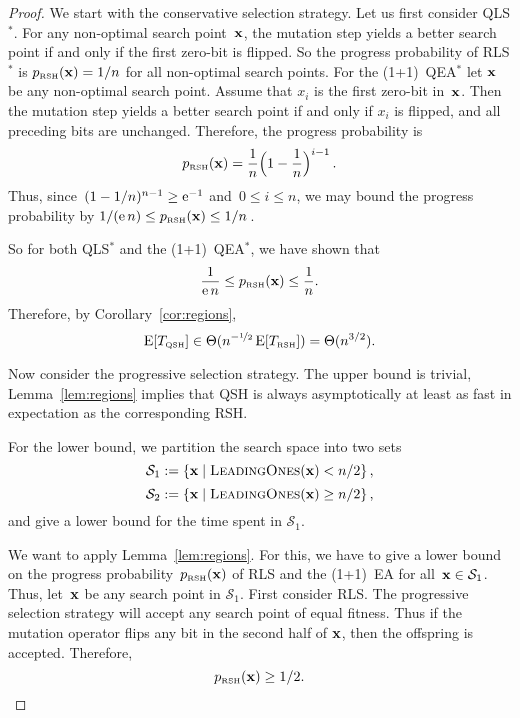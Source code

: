 \documentclass[a4paper,11pt]{article}
\begin{document}
\begin{proof}
 We start with the conservative selection strategy. Let us first consider QLS$^*$. For any non-optimal search point~$\xvec$, the mutation step yields a better search point if and only if the first zero-bit is flipped. So the progress probability of RLS$^*$ is $p_\RSH(\xvec) = 1/n$ for all non-optimal search points. For the (1+1)~QEA$^*$ let $\xvec$ be any non-optimal search point. Assume that $x_i$ is the first zero-bit in~$\xvec$. Then the mutation step yields a better search point if and only if $x_i$ is flipped, and all preceding bits are unchanged. Therefore, the progress probability is
 \[
 p_\RSH(\xvec) = \frac{1}{n}\Big(1-\frac{1}{n}\Big)^{i-1}\,.
 \]
 Thus, since~$(1-1/n)^{n-1}\ge\mathrm{e}^{-1}$ and~$0\le i\le n$, we may bound the progress probability by $1/(\euler\,n)\le p_\RSH(\xvec)\le 1/n\,$.

 So for both QLS$^*$ and the (1+1)~QEA$^*$, we have shown that
\[
\frac{1}{\euler\,n}\le p_\RSH(\xvec)\le \frac{1}{n}.
\]
Therefore, by Corollary~\ref{cor:regions},
 \[
 \operatorname{E}[T_{\text{\tiny\rm QSH}}] \in \Theta(n^{-\nicefrac{1}{2}}\operatorname{E}[T_{\text{\tiny\rm RSH}}]) = \Theta(n^{3/2}).
 \]

Now consider the progressive selection strategy. The upper bound is trivial,  Lemma~\ref{lem:regions} implies that QSH is always asymptotically at least as fast in expectation as the corresponding RSH.

 For the lower bound, we partition the search space into two sets 
 \[
 \mathcal{S}_1 := \left\{\xvec \mid \leadingones(\xvec) < n/2 \right\},
 \]
 \[
 \mathcal{S}_2 := \left\{\xvec \mid \leadingones(\xvec) \geq n/2 \right\},
 \]
and give a lower bound for the time spent in $\mathcal{S}_1$.


We want to apply Lemma~\ref{lem:regions}. For this, we have to give a lower bound on the progress probability~$p_\RSH(\xvec)$ of RLS and the (1+1)~EA for all~$\xvec\in\mathcal{S}_1$. Thus, let~$\xvec$ be any search point in $\mathcal{S}_1$. First consider RLS. The progressive selection strategy will accept any search point of equal fitness. Thus if the mutation operator flips any bit in the second half of $\xvec$, then the offspring is accepted. Therefore,
 \[
 p_\RSH(\xvec) \geq 1/2.
 \]


\end{proof}
\end{document}
